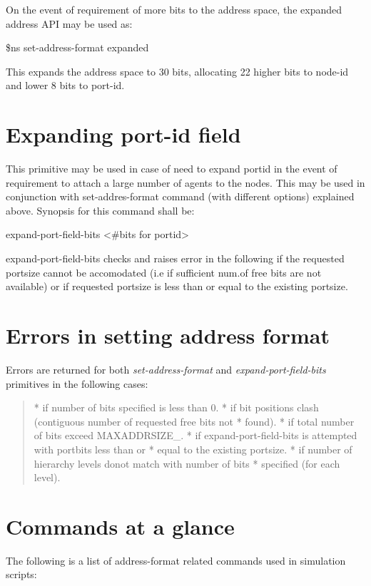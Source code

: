 On the event of requirement of more bits to the address space, the
expanded address API may be used as:

\$ns set-address-format expanded   

This expands the address space to 30 bits, allocating 22 higher bits to
node-id and lower 8 bits to port-id. 


\section{Expanding port-id field}    
\label{sec:expandportFormat}

This primitive may be used in case of need to expand portid in the event
of requirement to attach a large number of agents to the nodes. This may
be used in conjunction with set-addres-format command (with different
options) explained above. Synopsis for this command shall be:

expand-port-field-bits <\#bits for portid> 

expand-port-field-bits checks and raises error in the following if the
requested portsize cannot be accomodated (i.e if sufficient num.of free
bits are not available) or if requested portsize is less than or equal
to the existing portsize. 

\section{Errors in setting address format}
\label{sec:err-add}

Errors are returned for both {\em set-address-format} and
{\em expand-port-field-bits} primitives in the following cases:
\begin{quote}
* if number of bits specified is less than 0.
* if bit positions clash (contiguous number of requested free bits not
* found).  
* if total number of bits exceed MAXADDRSIZE\_.
* if expand-port-field-bits is attempted with portbits less than or
* equal to the existing portsize.
* if number of hierarchy levels donot match with number of bits
* specified (for each level).  
\end{quote}

\section{Commands at a glance}
\label{sec:addresscommand}

The following is a list of address-format related commands used in simulation
scripts:

